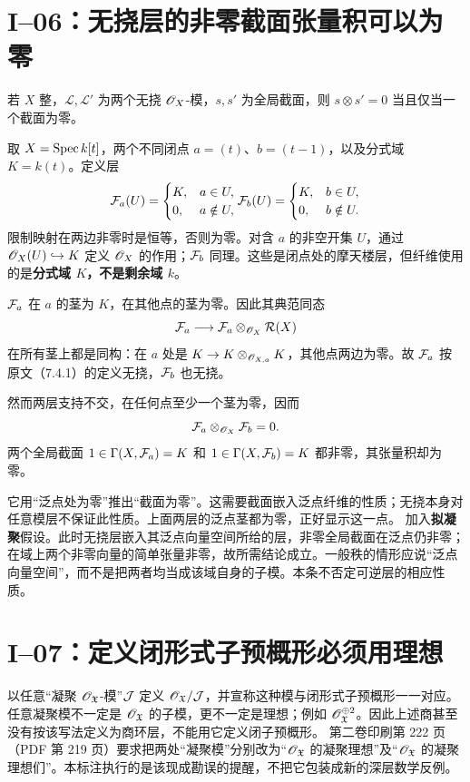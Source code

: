 \section{I--06：无挠层的非零截面张量积可以为零}
若 $X$ 整，$\mathcal L,\mathcal L'$ 为两个无挠 $\mathscr O_X$-模，$s,s'$ 为全局截面，则 $s\otimes s'=0$ 当且仅当一个截面为零。
\begin{analysisproof}
取 $X=\operatorname{Spec} k[t]$，两个不同闭点 $a=(t)$、$b=(t-1)$，以及分式域 $K=k(t)$。定义层
\[
\FF_a(U)=\begin{cases}K,&a\in U,\\0,&a\notin U,\end{cases}
\qquad
\FF_b(U)=\begin{cases}K,&b\in U,\\0,&b\notin U.\end{cases}
\]
限制映射在两边非零时是恒等，否则为零。对含 $a$ 的非空开集 $U$，通过 $\mathscr O_X(U)\hookrightarrow K$ 定义 $\mathscr O_X$ 的作用；$\mathcal F_b$ 同理。这些是闭点处的摩天楼层，但纤维使用的是\textbf{分式域 $K$，不是剩余域 $k$}。

$\mathcal F_a$ 在 $a$ 的茎为 $K$，在其他点的茎为零。因此其典范同态
\[
\mathcal F_a\longrightarrow\mathcal F_a\otimes_{\mathscr O_X}\mathcal R(X)
\]
在所有茎上都是同构：在 $a$ 处是 $K\to K\otimes_{\mathscr O_{X,a}}K$，其他点两边为零。故 $\mathcal F_a$ 按原文（7.4.1）的定义无挠，$\mathcal F_b$ 也无挠。

然而两层支持不交，在任何点至少一个茎为零，因而
\[
\mathcal F_a\otimes_{\mathscr O_X}\mathcal F_b=0.
\]
两个全局截面 $1\in\Gamma(X,\mathcal F_a)=K$ 和 $1\in\Gamma(X,\mathcal F_b)=K$ 都非零，其张量积却为零。
\end{analysisproof}
它用“泛点处为零”推出“截面为零”。这需要截面嵌入泛点纤维的性质；无挠本身对任意模层不保证此性质。上面两层的泛点茎都为零，正好显示这一点。
加入\textbf{拟凝聚}假设。此时无挠层嵌入其泛点向量空间所给的层，非零全局截面在泛点仍非零；在域上两个非零向量的简单张量非零，故所需结论成立。一般秩的情形应说“泛点向量空间”，而不是把两者均当成该域自身的子模。本条不否定可逆层的相应性质。

\section{I--07：定义闭形式子预概形必须用理想}
以任意“凝聚 $\mathscr O_{\mathfrak X}$-模”$\mathcal J$ 定义 $\mathscr O_{\mathfrak X}/\mathcal J$，并宣称这种模与闭形式子预概形一一对应。
任意凝聚模不一定是 $\mathscr O_{\mathfrak X}$ 的子模，更不一定是理想；例如 $\mathscr O_{\mathfrak X}^{\oplus2}$。因此上述商甚至没有按该写法定义为商环层，不能用它定义闭子预概形。
第二卷印刷第 222 页（PDF 第 219 页）要求把两处“凝聚模”分别改为“$\mathscr O_{\mathfrak X}$ 的凝聚理想”及“$\mathscr O_{\mathfrak X}$ 的凝聚理想们”。本标注执行的是该现成勘误的提醒，不把它包装成新的深层数学反例。

